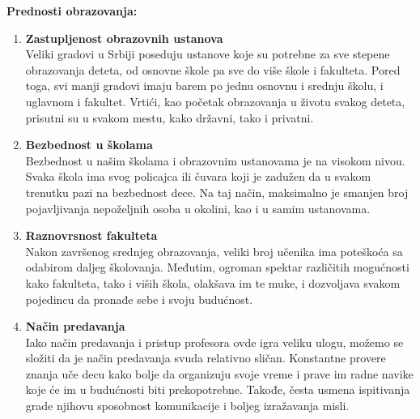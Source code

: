 \documentclass[a4paper]{article}
\begin{document}
\textbf{ Prednosti obrazovanja:}
\begin{enumerate}
    \item \textbf{Zastupljenost obrazovnih ustanova}
    \\Veliki gradovi u Srbiji poseduju ustanove koje su potrebne za sve stepene obrazovanja deteta, od osnovne škole pa sve do više škole i fakulteta. Pored toga, svi manji gradovi imaju barem po jednu osnovnu i srednju školu, i uglavnom i fakultet. Vrtići, kao početak obrazovanja u životu svakog deteta, prisutni su u svakom mestu, kako državni, tako i privatni.
    \item \textbf{Bezbednost u školama}
    \\Bezbednost u našim školama i obrazovnim ustanovama je na visokom nivou. Svaka škola ima svog policajca ili čuvara koji je zadužen da u svakom trenutku pazi na bezbednost dece. Na taj način, maksimalno je smanjen broj pojavljivanja nepoželjnih osoba u okolini, kao i u samim ustanovama.
     \item \textbf{Raznovrsnost fakulteta}
     \\Nakon završenog srednjeg obrazovanja, veliki broj učenika ima poteškoća sa odabirom daljeg školovanja. Međutim, ogroman spektar različitih mogućnosti kako fakulteta, tako i viših škola, olakšava im te muke, i dozvoljava svakom pojedincu da pronađe sebe i svoju budućnost.
     \item \textbf{Način predavanja}
     \\Iako način predavanja i pristup profesora ovde igra veliku ulogu, možemo se složiti da je način predavanja  svuda relativno sličan. Konstantne provere znanja uče decu kako bolje da organizuju svoje vreme i prave im radne navike koje će im u budućnosti biti prekopotrebne. Takođe, česta usmena ispitivanja  grade njihovu sposobnost komunikacije i boljeg izražavanja misli. \cite{referenca7}

\end{enumerate}
\end{document}
